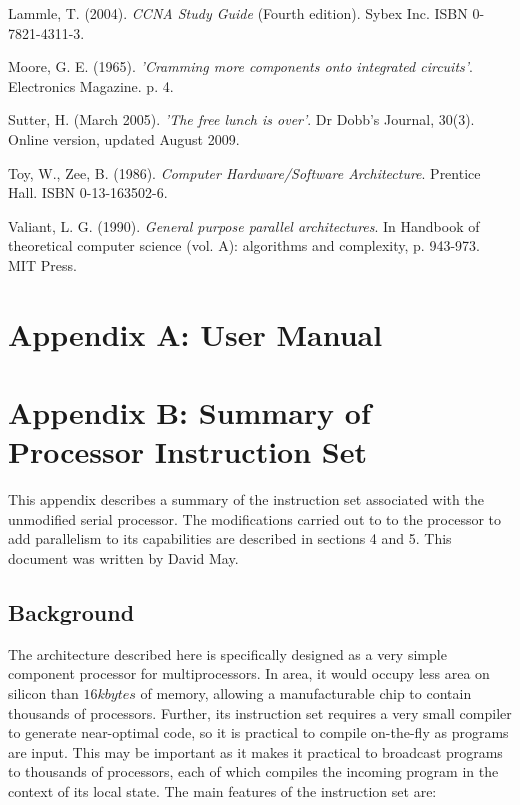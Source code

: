 \documentclass[a4paper, 12pt]{article}
\begin{document}
\begin{thebibliography}{30}
 Lammle, T. (2004). \textit{CCNA Study Guide} (Fourth edition). Sybex Inc. ISBN 0-7821-4311-3.

 Moore, G. E. (1965). \textit{'Cramming more components onto integrated circuits'}. Electronics Magazine. p. 4.

 Sutter, H. (March 2005). \textit{'The free lunch is over'}. Dr Dobb's Journal, 30(3). Online version, updated August 2009.

 Toy, W., Zee, B. (1986). \textit{Computer Hardware/Software Architecture}. Prentice Hall. ISBN 0-13-163502-6.

 Valiant, L. G. (1990). \textit{General purpose parallel architectures}. In Handbook of theoretical computer science (vol. A): algorithms and complexity, p. 943-973. MIT Press.

\end{thebibliography}

\newpage
\section*{Appendix A: User Manual}


\newpage
\section*{Appendix B: Summary of Processor Instruction Set}

This appendix describes a summary of the instruction set associated with the unmodified serial processor. The modifications carried out to to the processor to add parallelism to its capabilities are described in sections 4 and 5. This document was written by David May.

\subsection*{Background}
\setlength{\parindent}{0in}

The architecture described here is specifically designed as a very
simple component processor for multiprocessors. In area, it 
would occupy less area on silicon than $16kbytes$ of memory,
allowing a manufacturable chip to contain thousands 
of  processors.
Further, its instruction set requires a very small compiler to
generate near-optimal code, so it is practical to compile 
on-the-fly as programs are input. This may be important 
as it makes it practical to broadcast programs to 
thousands of processors, each of which compiles the
incoming program in the context of its local state. The main
features of the instruction set are: 
\end{document}
